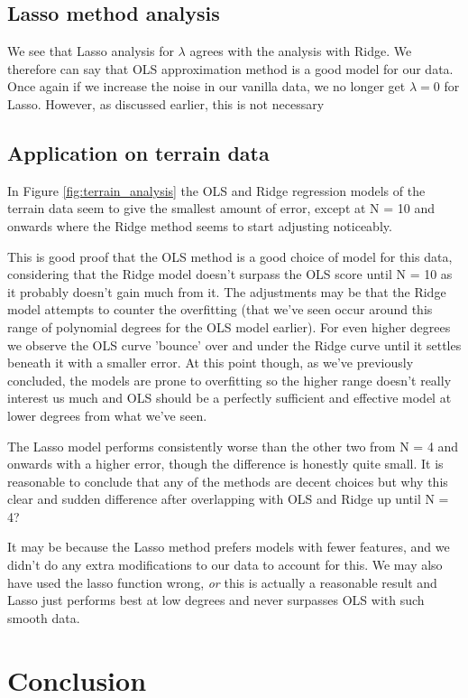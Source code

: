 \documentclass[reprint,english,notitlepage]{revtex4-1}  %
\begin{document}
\subsection{Lasso method analysis}
We see that Lasso analysis for $\lambda$ agrees with the analysis with Ridge. We therefore can say that OLS approximation method is a good model for our data. Once again if we increase the noise in our vanilla data, we no longer get $\lambda = 0$ for Lasso. However, as discussed earlier, this is not necessary 

\subsection{Application on terrain data}

In Figure \ref{fig:terrain_analysis} the OLS and Ridge regression models of the terrain data seem to give the smallest amount of error, except at N = 10 and onwards where the Ridge method seems to start adjusting noticeably.

This is good proof that the OLS method is a good choice of model for this data, considering that the Ridge model doesn't surpass the OLS score until N = 10 as it probably doesn't gain much from it. The adjustments may be that the Ridge model attempts to counter the overfitting (that we've seen occur around this range of polynomial degrees for the OLS model earlier). For even higher degrees we observe the OLS curve 'bounce' over and under the Ridge curve until it settles beneath it with a smaller error. At this point though, as we've previously concluded, the models are prone to overfitting so the higher range doesn't really interest us much and OLS should be a perfectly sufficient and effective model at lower degrees from what we've seen.

The Lasso model performs consistently worse than the other two from N = 4 and onwards with a higher error, though the difference is honestly quite small. It is reasonable to conclude that any of the methods are decent choices but why this clear and sudden difference after overlapping with OLS and Ridge up until N = 4? 

It may be because the Lasso method prefers models with fewer features, and we didn't do any extra modifications to our data to account for this. We may also have used the lasso function wrong, \textit{or} this is actually a reasonable result and Lasso just performs best at low degrees and never surpasses OLS with such smooth data.

\section{Conclusion}
\end{document}
